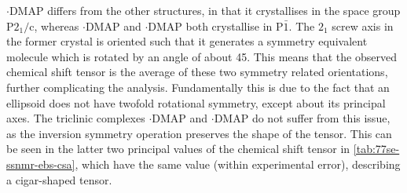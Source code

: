 \begin{refsection}
$ \cdot $DMAP differs from the other structures, in that it crystallises in the space group $\mathrm{P2_1/c}$, whereas $ \cdot $DMAP and $ \cdot $DMAP both crystallise in $\mathrm{P\bar{1}}$.
The $2_1$ screw axis in the former crystal is oriented such that it generates a symmetry equivalent molecule which is rotated by an angle of about 45\degree.
This means that the observed chemical shift tensor is the average of these two symmetry related orientations, further complicating the analysis.
Fundamentally this is due to the fact that an ellipsoid does not have twofold rotational symmetry, except about its principal axes.
The triclinic complexes $ \cdot $DMAP and $ \cdot $DMAP do not suffer from this issue, as the inversion symmetry operation preserves the shape of the tensor.
This can be seen in the latter two principal values of the chemical shift tensor in \cref{tab:77se-ssnmr-ebs-csa}, which have the same value (within experimental error), describing a cigar-shaped tensor.


\end{refsection}
